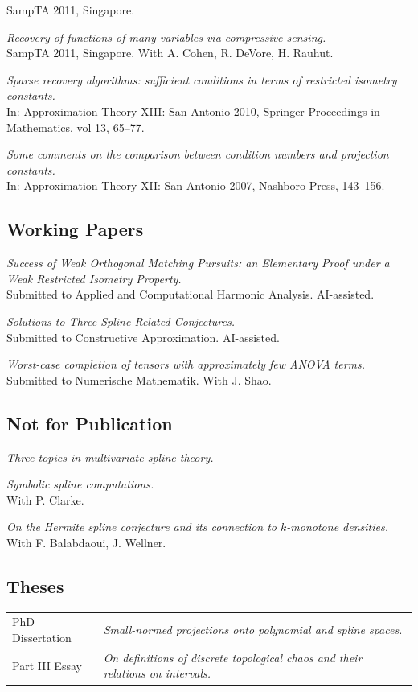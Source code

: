 \documentclass[11pt]{article}
\begin{document}
SampTA 2011, Singapore.
\item {\sl Recovery of functions of many variables via compressive sensing.}\\
SampTA 2011, Singapore. 
With A. Cohen, R. DeVore, H. Rauhut.
\item {\sl Sparse recovery algorithms: sufficient conditions in terms of restricted isometry constants.}\\
In: Approximation Theory XIII: San Antonio 2010, Springer Proceedings in Mathematics, vol 13, 65--77.
\item {\sl  Some comments on the comparison between condition numbers and projection constants.}\\
In: Approximation Theory XII: San Antonio 2007, Nashboro Press, 143--156. 
\eetaremune

\subsection{Working Papers}
\betaremune
\item {\sl Success of Weak Orthogonal Matching Pursuits: an Elementary Proof under a Weak Restricted Isometry Property.}\\
Submitted to Applied and Computational Harmonic Analysis. {\sf AI-assisted}.
\item {\sl Solutions to Three Spline-Related Conjectures.}\\
Submitted to Constructive Approximation. {\sf AI-assisted}.
\item {\sl Worst-case completion of tensors with approximately few ANOVA terms.}\\
Submitted to Numerische Mathematik. With J. Shao.
\eetaremune

\subsection{Not for Publication}
\betaremune
\item {\sl Three topics in multivariate spline theory.}
\item {\sl Symbolic spline computations.}\\
 With P. Clarke.
\item {\sl On the Hermite spline conjecture and its connection to $k$-monotone densities.}\\
With F. Balabdaoui, J. Wellner.
\eetaremune

\subsection{Theses}
\begin{tabular}{ll}
PhD Dissertation & {\sl Small-normed projections onto polynomial and spline spaces.}\\
Part III Essay & {\sl On definitions of discrete topological chaos and their relations on intervals.}
\end{tabular}
\end{document}
